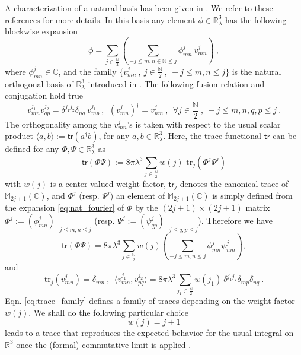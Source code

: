 \documentclass[11pt]{book}
\newcommand{\tr}{\mathsf{tr}}
\newcommand{\Cbb}{\mathbb{C}}
\newcommand{\Mbb}{\mathbb{M}}
\theoremstyle{break}
\begin{document}
A characterization of a natural basis has been given in \cite{vitale_noncommutative_2013}. We refer to these references for more details. In this basis any element $\phi\in\mathbb{R}^3_\lambda$ has the following blockwise expansion
%
\begin{equation}
\phi = \sum_{j\in\frac{\mathbb{N}}{2}} \left( \sum_{-j\le m,n\in\mathbb{N}\le j} \phi^j_{mn} \ v^j_{mn} \right) \ , 
\label{eq:nat_fourier}
\end{equation}
%
where $\phi^j_{mn}\in\mathbb{C}$, and the family $\{v^j_{mn} \ , \ j\in\frac{\mathbb{N}}{2} \ ,\ -j\le m,n\le j\}$ is the natural orthogonal basis of $\mathbb{R}^3_\lambda$ introduced in \cite{vitale_noncommutative_2013}. The following fusion relation and conjugation hold true%
%
\begin{equation*}
v^{j_1}_{mn} v^{j_2}_{qp} = \delta^{j_1j_2} \delta_{nq} \ v^{j_1}_{mp} \ , \ \ (v^j_{mn})^\dag=v^j_{nm} \ , \ \ 
\forall j\in\frac{\mathbb{N}}{2} \ , \ -j\le m,n,q,p\le j \ . 
\end{equation*}
%
The orthogonality among the $v^j_{mn}$'s is taken with respect to the usual scalar product $\langle a,b\rangle:=\tr(a^\dag b)$, for any $a,b\in\mathbb{R}^3_\lambda$. Here, the trace functional $\tr$ can be defined \cite{gere_quantum_2014} for any $\Phi,\Psi\in\mathbb{R}^3_\lambda$ as
%
\begin{equation}
\tr(\Phi\Psi) := 8 \pi \lambda^3 \sum_{j\in\frac{\mathbb{N}}{2}} w(j) \mbox{ tr}_j(\Phi^j\Psi^j)
\label{eq:trace_family}
\end{equation}
%
with $w(j)$ is a center-valued weight factor, $\tr_j$ denotes the canonical trace of $\Mbb_{2j+1}(\Cbb)$, and $\Phi^j$ (resp. $\Psi^j$) an element of $\Mbb_{2j+1}(\Cbb)$ is simply defined from the expansion \eqref{eq:nat_fourier} of $\Phi$ by the $(2j+1)\times(2j+1)$ matrix $\Phi^j:=(\phi^j_{mn})_{-j\le m,n\le j}$ (resp. $\Psi^j:= (\psi^j_{qp})_{-j\le q,p\le j}$). Therefore we have%
%
\begin{equation*}
\tr(\Phi\Psi)  = 8 \pi \lambda^3 \sum_{j\in\frac{\mathbb{N}}{2}} w(j) \left( \sum_{-j\le m,n\le j}\phi^j_{mn}\psi^j_{nm}\right), 
\end{equation*}
%
and%
%
\begin{equation*}
\mbox{tr}_j(v^j_{mn}) = \delta_{mn} \ , \ \
\langle v^{j_1}_{mn} , v^{j_2}_{pq} \rangle = 8 \pi \lambda^3 \sum_{j_1\in\frac{\mathbb{N}}{2}} w(j_1) \ \delta^{j_1j_2} \delta_{mp} \delta_{nq} \ . 
\end{equation*}
%
Eqn. \eqref{eq:trace_family} defines a family of traces depending on the weight factor $w(j)$. We shall do the following particular choice%
%
\begin{equation*}
w(j)=j+1
\end{equation*}
%
leads to a trace that reproduces the expected behavior for the usual integral on $\mathbb{R}^3$ once the (formal) commutative limit is applied \cite{gere_quantum_2014}. 
\end{document}
